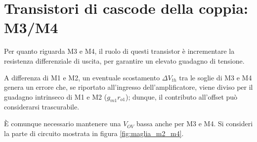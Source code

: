 \documentclass[12pt,a4paper,twoside]{report}
\begin{document}
\section{Transistori di cascode della coppia: M3/M4}
\label{sec:m3/m4}
Per quanto riguarda M3 e M4, il ruolo di questi transistor è incrementare la resistenza differenziale di uscita, per garantire un elevato guadagno di tensione.

A differenza di M1 e M2, un eventuale scostamento $\Delta V_{th}$ tra le soglie di M3 e M4 genera un errore che, se riportato all'ingresso dell'amplificatore, viene diviso per il guadagno intrinseco di M1 e M2 ($g_{m1} r_{o1}$); dunque, il contributo all'offset può considerarsi trascurabile.

È comunque necessario mantenere una $V_{OV}$ bassa anche per M3 e M4. Si consideri la parte di circuito mostrata in figura \ref{fig:maglia_m2_m4}.
\end{document}
